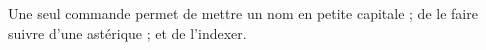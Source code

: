 \newcommand{\nom}[1]{%
  \textsc{#1}*\index[nom]{#1} %
}

Une seul commande permet de 
mettre un nom en petite capitale ;
de le faire suivre d'une astérique ;
et de l'indexer.
